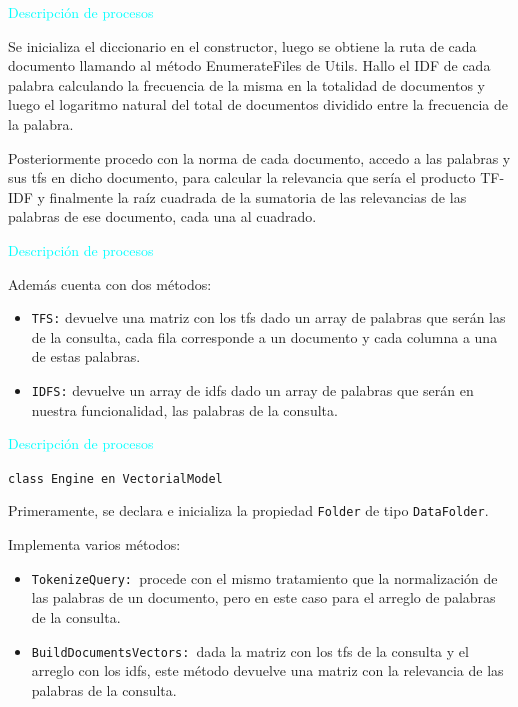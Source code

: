 \documentclass[a4paper, 12pt]{beamer}
\begin{document}
\begin{frame}{\textcolor{cyan}{Descripción de procesos}}
    
    {\small Se inicializa el diccionario en el constructor, luego se obtiene la ruta de cada
    documento llamando al método EnumerateFiles de Utils. Hallo el IDF de cada
    palabra calculando la frecuencia de la misma en la totalidad de documentos y luego
    el logaritmo natural del total de documentos dividido entre la frecuencia de la
    palabra.}

    {\small Posteriormente procedo con la norma de cada documento, accedo a las palabras y
    sus tfs en dicho documento, para calcular la relevancia que sería el producto TF-IDF
    y finalmente la raíz cuadrada de la sumatoria
    de las relevancias de las palabras de ese documento, cada una al cuadrado.}

\end{frame}

\begin{frame}{\textcolor{cyan}{Descripción de procesos}}
    
    Además cuenta con dos métodos:
   \begin{itemize}
    \item {\tt TFS:} devuelve una matriz con los tfs dado un array de palabras que serán las de la consulta, cada fila corresponde a un documento y cada columna a una de estas palabras. 
    \item {\tt IDFS:} devuelve un array de idfs dado un array de palabras que serán en nuestra funcionalidad, las palabras de la consulta.
   \end{itemize}
\end{frame}

\begin{frame}{\textcolor{cyan}{Descripción de procesos}}
    
    {\tt class Engine en VectorialModel}

    {\small Primeramente, se declara e inicializa la propiedad {\tt Folder} de tipo {\tt DataFolder}.}

    Implementa varios métodos:

    \begin{itemize}
        \item {\small {\tt TokenizeQuery: }procede con el mismo tratamiento que la normalización
        de las palabras de un documento, pero en este caso para el arreglo de
        palabras de la consulta.}
        \item {\small {\tt BuildDocumentsVectors: }dada la matriz con los tfs de la consulta y el
        arreglo con los idfs, este método devuelve una matriz con la relevancia de
        las palabras de la consulta.}
    \end{itemize}

\end{frame}
\end{document}
